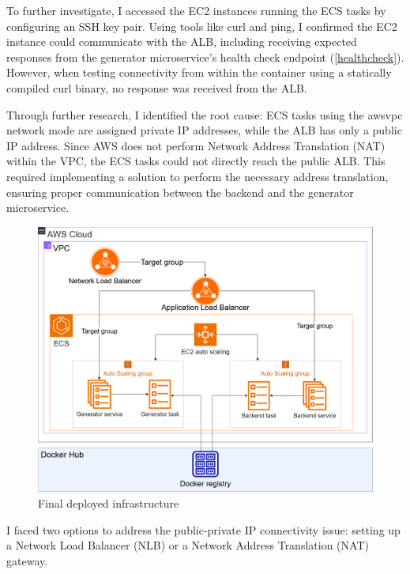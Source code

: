 		To further investigate, I accessed the EC2 instances running the ECS tasks by configuring an SSH key pair. 
		Using tools like curl and ping, I confirmed the EC2 instance could communicate with the ALB, including receiving expected responses 
		from the generator microservice's health check endpoint (\ref{healthcheck}). However, when testing connectivity from within the container 
		using a statically compiled curl binary, no response was received from the ALB.

		Through further research, I identified the root cause: ECS tasks using the awsvpc network mode are assigned private IP addresses, 
		while the ALB has only a public IP address. Since AWS does not perform Network Address Translation (NAT) within the VPC, 
		the ECS tasks could not directly reach the public ALB. This required implementing a solution to perform the necessary address translation, 
		ensuring proper communication between the backend and the generator microservice.

		\begin{figure}[h!]
			\begin{center}
				\includegraphics[scale=0.35]{include/imgs/final_aws_infra.png}
				\caption{Final deployed infrastructure}
				\label{infrafinal}
			\end{center}
		\end{figure}

		I faced two options to address the public-private IP connectivity issue: setting up a Network Load Balancer (NLB) or a Network Address Translation (NAT) gateway.

